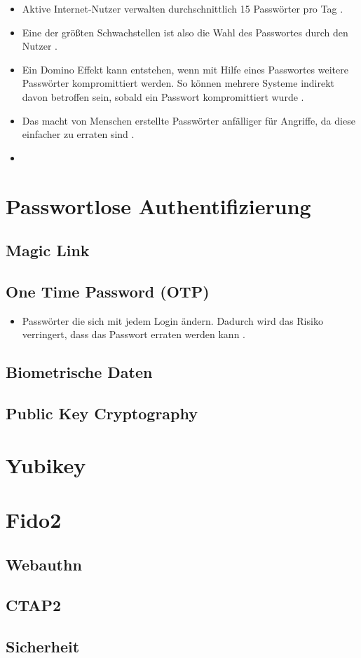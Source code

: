\begin{itemize}
    \item Aktive Internet-Nutzer verwalten durchschnittlich 15 Passwörter pro Tag \cite{ives2004domino}.
    \item Eine der größten Schwachstellen ist also die Wahl des Passwortes durch den Nutzer \cite{boonkrong2012security}.
    \item Ein Domino Effekt kann entstehen, wenn mit Hilfe eines Passwortes weitere Passwörter kompromittiert werden. So können mehrere Systeme indirekt davon betroffen sein, sobald ein Passwort kompromittiert wurde \cite{ives2004domino}.
    \item Das macht von Menschen erstellte Passwörter anfälliger für Angriffe, da diese einfacher zu erraten sind \cite{chanda2016password}.
    \item 
\end{itemize}

\section{Passwortlose Authentifizierung}

\subsection{Magic Link}

\subsection{One Time Password (OTP)}
\begin{itemize}
    \item Passwörter die sich mit jedem Login ändern. Dadurch wird das Risiko verringert, dass das Passwort erraten werden kann \cite{boonkrong2012security}.
\end{itemize}

\subsection{Biometrische Daten}

\subsection{Public Key Cryptography}

\section{Yubikey}

\section{Fido2}

\subsection{Webauthn}

\subsection{CTAP2}

\subsection{Sicherheit}